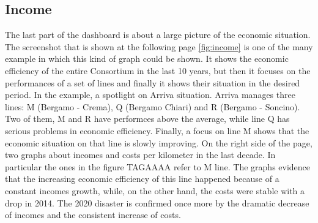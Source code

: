 \subsection{Income}
The last part of the dashboard is about a large picture of the economic situation. The screenshot that is shown at the following page \ref{fig:income} is one of the many example in which this kind of graph could be shown. It shows the economic efficiency of the entire Consortium in the last 10 years, but then it focuses on the performances of a set of lines and finally it shows their situation in the desired period. In the example, a spotlight on Arriva situation. Arriva manages three lines: M (Bergamo - Crema), Q (Bergamo Chiari) and R (Bergamo - Soncino). Two of them, M and R have performces above the average, while line Q has serious problems in economic efficiency. Finally, a focus on line M shows that the economic situation on that line is slowly improving. 
On the right side of the page, two graphs about incomes and costs per kilometer in the last decade. In particular the ones in the figure TAGAAAA refer to M line. The graphs evidence that the increasing economic efficiency of this line happened because of a constant incomes growth, while, on the other hand, the costs were stable with a drop in 2014. The 2020 disaster is confirmed once more by the dramatic decrease of incomes and the consistent increase of costs.
\newpage
\begin{landscape}
\thispagestyle{empty}

\end{landscape}